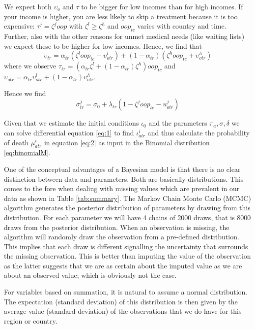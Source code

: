 \documentclass[a4paper,12pt]{article}
\begin{document}
We expect both \(\upsilon_o\) and \(\tau\) to be bigger for low incomes than for high incomes. If your income is higher, you are less likely to skip a treatment because it is too expensive: \(\tau^j = \zeta^j oop\) with \(\zeta^l \geq \zeta^h\) and \(oop_{tc}\) varies with country and time. Further, also with the other reasons for unmet medical needs (like waiting lists) we expect these to be higher for low incomes. Hence, we find that
\begin{equation}
\label{eq:Unmet}
\upsilon_{tr} = \alpha_{tr} (\zeta^{l} oop_{tc} + \upsilon_{otr}^l) + (1-\alpha_{tr}) (\zeta^h oop_{tc} + \upsilon_{otr}^{h})
\end{equation}
where we observe \(\tau_{tr} = (\alpha_{tr} \zeta^l + (1-\alpha_{tr}) \zeta^h) oop_{tc}\) and \(\upsilon_{otr} = \alpha_{tr} \upsilon^l_{otr} + (1-\alpha_{tr}) \upsilon^h_{otr}\).

Hence we find
\begin{equation}
\label{eq:sigma}
\sigma_{tr}^{j} = \sigma_{0} + \lambda_{tr} (1-\zeta^j oop_{tc} - u_{otr}^{j})
\end{equation}

Given that we estimate the initial conditions \(\iota_0\) and the parameters \(\pi_a, \sigma, \delta\) we can solve differential equation \eqref{eq:1} to find \(\iota_{atr}^i\) and thus calculate the probability of death \(\mu_{atr}^i\) in equation \eqref{eq:2} as input in the Binomial distribution \eqref{eq:binomialM}.

One of the conceptual advantages of a Bayesian model is that there is no clear distinction between data and parameters. Both are basically distributions. This comes to the fore when dealing with missing values which are prevalent in our data as shown in Table \ref{tab:summary}. The Markov Chain Monte Carlo (MCMC) algorithm generates the posterior distribution of parameters by drawing from this distribution. For each parameter we will have 4 chains of 2000 draws, that is 8000 draws from the posterior distribution. When an observation is missing, the algorithm will randomly draw the observation from a pre-defined distribution. This implies that each draw is different signalling the uncertainty that surrounds the missing observation. This is better than imputing the value of the observation as the latter suggests that we are as certain about the imputed value as we are about an observed value; which is obviously not the case.

For variables based on summation, it is natural to assume a normal distribution. The expectation (standard deviation) of this distribution is then given by the average value (standard deviation) of the observations that we do have for this region or country.
\end{document}
